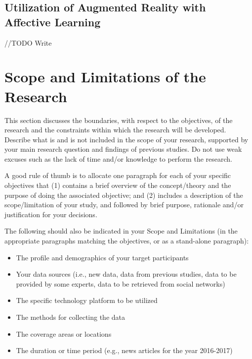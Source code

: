 \subsection{Utilization of Augmented Reality with Affective Learning}
//TODO Write


\section{Scope and Limitations of the Research}
\label{sec:scopelimitations}

This section discusses the boundaries, with respect to the objectives, of the research and the constraints within which the research will be developed. Describe what is and is not included in the scope of your research, supported by your main research question and findings of previous studies. Do not use weak excuses such as the lack of time and/or knowledge to perform the research.

A good rule of thumb is to allocate one paragraph for each of your specific objectives that (1) contains a brief overview of the concept/theory and the purpose of doing the associated objective; and (2) includes a description of the scope/limitation of your study, and followed by brief purpose, rationale and/or justification for your decisions.

The following should also be indicated in your Scope and Limitations (in the appropriate paragraphs matching the objectives, or as a stand-alone paragraph):
\begin{itemize}
   \item The profile and demographics of your target participants
   \item Your data sources (i.e., new data, data from previous studies, data to be provided by some experts, data to be retrieved from social networks)
   \item The specific technology platform to be utilized
   \item The methods for collecting the data
   \item The coverage areas or locations
   \item The duration or time period (e.g., news articles for the year 2016-2017)
\end{itemize}


